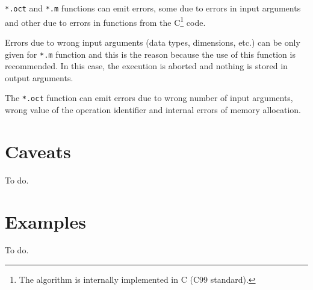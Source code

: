\documentclass[10pt,a4paper]{article}
\begin{document}
\texttt{*.oct} and \texttt{*.m} functions can emit errors, some due to errors in
input arguments and other due to errors in functions from the C\footnote{The
algorithm is internally implemented in C (C99 standard).} code.

Errors due to wrong input arguments (data types, dimensions, etc.) can be only
given for \texttt{*.m} function and this is the reason because the use of this
function is recommended. In this case, the execution is aborted and nothing is
stored in output arguments.

The \texttt{*.oct} function can emit errors due to wrong number of input
arguments, wrong value of the operation identifier and internal errors of memory
allocation.

\section{Caveats}

To do.

\section{Examples}

To do.
\end{document}
